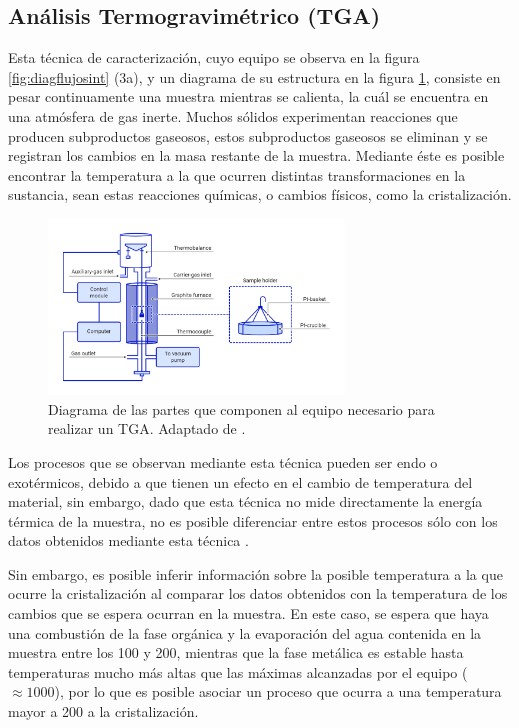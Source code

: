 \documentclass[../main.tex]{subfiles}
\begin{document}
\subsection{Análisis Termogravimétrico (TGA)}
Esta técnica de caracterización, cuyo equipo se observa en la figura \ref{fig:diagflujosint} (3a), y un diagrama de su estructura en la figura \ref{fig:diagTGA}, consiste en pesar continuamente una muestra mientras se calienta, la cuál se encuentra en una atmósfera de gas inerte. Muchos sólidos experimentan reacciones que producen subproductos gaseosos, estos subproductos gaseosos se eliminan y se registran los cambios en la masa restante de la muestra. Mediante éste es posible encontrar la temperatura a la que ocurren distintas transformaciones en la sustancia, sean estas reacciones químicas, o cambios físicos, como la cristalización.
\begin{figure}[H]
    \centering
    \includegraphics[width=0.7\textwidth]{fig/tgadiag.png}
    \caption{Diagrama de las partes que componen al equipo necesario para realizar un TGA. Adaptado de \cite{TGADIAG}.}
    \label{fig:diagTGA}
\end{figure}
Los procesos que se observan mediante esta técnica pueden ser endo o exotérmicos, debido a que tienen un efecto en el cambio de temperatura del material, sin embargo, dado que esta técnica no mide directamente la energía térmica de la muestra, no es posible diferenciar entre estos procesos sólo con los datos obtenidos mediante esta técnica \cite{TGA}.

Sin embargo, es posible inferir información sobre la posible temperatura a la que ocurre la cristalización al comparar los datos obtenidos con la temperatura de los cambios que se espera ocurran en la muestra. En este caso, se espera que haya una combustión de la fase orgánica y la evaporación del agua contenida en la muestra entre los 100 y 200\gradoC{}, mientras que la fase metálica es estable hasta temperaturas mucho más altas que las máximas alcanzadas por el equipo ($\approx1000$\gradoC{}), por lo que es posible asociar un proceso que ocurra a una temperatura mayor a 200\gradoC{} a la cristalización.
\end{document}
